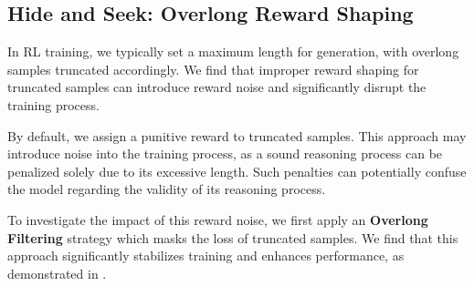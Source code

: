 

\subsection{Hide and Seek: Overlong Reward Shaping}
\label{sec:overlong}

In RL training, we typically set a maximum length for generation, with overlong samples truncated accordingly. We find that improper reward shaping for truncated samples can introduce reward noise and significantly disrupt the training process.

By default, we assign a punitive reward to truncated samples.
This approach may introduce noise into the training process, as a sound reasoning process can be penalized solely due to its excessive length. Such penalties can potentially confuse the model regarding the validity of its reasoning process.

\vspace{5pt}
To investigate the impact of this reward noise, we first apply an \textbf{Overlong Filtering} strategy which masks the loss of truncated samples. We find that this approach significantly stabilizes training and enhances performance, as demonstrated in .


